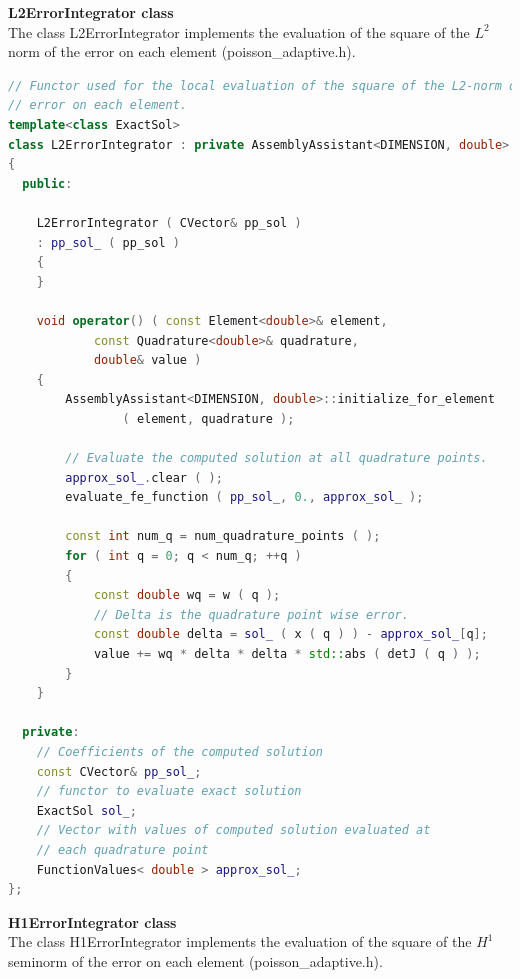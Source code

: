 \documentclass[a4paper, 11pt, twoside]{article}
\begin{document}
\textbf{L2ErrorIntegrator class}\\
The class L2ErrorIntegrator implements the evaluation of the square of the $L^2$ norm of the error on each element (poisson\_adaptive.h).

\begin{lstlisting}[language=C++, basicstyle={\footnotesize, \ttfamily}, keywordstyle=\color{blue}, numbers=none, tabsize=4]
// Functor used for the local evaluation of the square of the L2-norm of the
// error on each element.
template<class ExactSol>
class L2ErrorIntegrator : private AssemblyAssistant<DIMENSION, double>
{
  public:

    L2ErrorIntegrator ( CVector& pp_sol )
    : pp_sol_ ( pp_sol )
    {
    }

    void operator() ( const Element<double>& element,
            const Quadrature<double>& quadrature,
            double& value )
    {
        AssemblyAssistant<DIMENSION, double>::initialize_for_element
                ( element, quadrature );

        // Evaluate the computed solution at all quadrature points.
        approx_sol_.clear ( );
        evaluate_fe_function ( pp_sol_, 0., approx_sol_ );

        const int num_q = num_quadrature_points ( );
        for ( int q = 0; q < num_q; ++q )
        {
            const double wq = w ( q );
            // Delta is the quadrature point wise error.
            const double delta = sol_ ( x ( q ) ) - approx_sol_[q];
            value += wq * delta * delta * std::abs ( detJ ( q ) );
        }
    }

  private:
    // Coefficients of the computed solution
    const CVector& pp_sol_;
    // functor to evaluate exact solution
    ExactSol sol_;
    // Vector with values of computed solution evaluated at
    // each quadrature point
    FunctionValues< double > approx_sol_;
};
\end{lstlisting}

\textbf{H1ErrorIntegrator class}\\
The class H1ErrorIntegrator implements the evaluation of the square of the $H^1$ seminorm of the error on each element (poisson\_adaptive.h).
\end{document}
